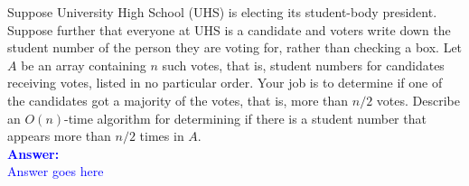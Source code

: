 \item{}
Suppose University High School (UHS) is electing its student-body president.
Suppose further that everyone at UHS is a candidate and voters write down the
student number of the person they are voting for, rather than checking a box.
Let $A$ be an array containing $n$ such votes, that is, student numbers for
candidates receiving votes, listed in no particular order. Your job is to
determine if one of the candidates got a majority of the votes, that is, more
than $n/2$ votes. Describe an $O(n)$-time algorithm for determining if there is
a student number that appears more than $n/2$ times in $A$.\\[12pt]
\ifanswers
\textcolor{blue}{
\textbf{Answer:}\\[6pt]
Answer goes here
}
\newpage
\fi
